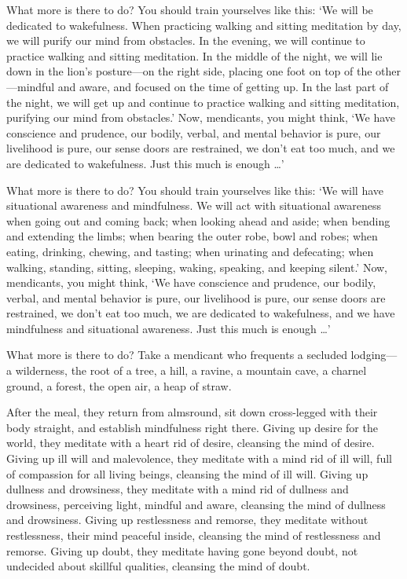\documentclass[12pt,openany]{book}%
\begin{document}
What more is there to do? You should train yourselves like this: ‘We will be dedicated to wakefulness. When practicing walking and sitting meditation by day, we will purify our mind from obstacles. In the evening, we will continue to practice walking and sitting meditation. In the middle of the night, we will lie down in the lion’s posture—on the right side, placing one foot on top of the other—mindful and aware, and focused on the time of getting up. In the last part of the night, we will get up and continue to practice walking and sitting meditation, purifying our mind from obstacles.’ Now, mendicants, you might think, ‘We have conscience and prudence, our bodily, verbal, and mental behavior is pure, our livelihood is pure, our sense doors are restrained, we don’t eat too much, and we are dedicated to wakefulness. Just this much is enough …’ 

What more is there to do? You should train yourselves like this: ‘We will have situational awareness and mindfulness. We will act with situational awareness when going out and coming back; when looking ahead and aside; when bending and extending the limbs; when bearing the outer robe, bowl and robes; when eating, drinking, chewing, and tasting; when urinating and defecating; when walking, standing, sitting, sleeping, waking, speaking, and keeping silent.’ Now, mendicants, you might think, ‘We have conscience and prudence, our bodily, verbal, and mental behavior is pure, our livelihood is pure, our sense doors are restrained, we don’t eat too much, we are dedicated to wakefulness, and we have mindfulness and situational awareness. Just this much is enough …’ 

What more is there to do? Take a mendicant who frequents a secluded lodging—a wilderness, the root of a tree, a hill, a ravine, a mountain cave, a charnel ground, a forest, the open air, a heap of straw. 

After the meal, they return from almsround, sit down cross-legged with their body straight, and establish mindfulness right there. Giving up desire for the world, they meditate with a heart rid of desire, cleansing the mind of desire. Giving up ill will and malevolence, they meditate with a mind rid of ill will, full of compassion for all living beings, cleansing the mind of ill will. Giving up dullness and drowsiness, they meditate with a mind rid of dullness and drowsiness, perceiving light, mindful and aware, cleansing the mind of dullness and drowsiness. Giving up restlessness and remorse, they meditate without restlessness, their mind peaceful inside, cleansing the mind of restlessness and remorse. Giving up doubt, they meditate having gone beyond doubt, not undecided about skillful qualities, cleansing the mind of doubt. 
\end{document}

